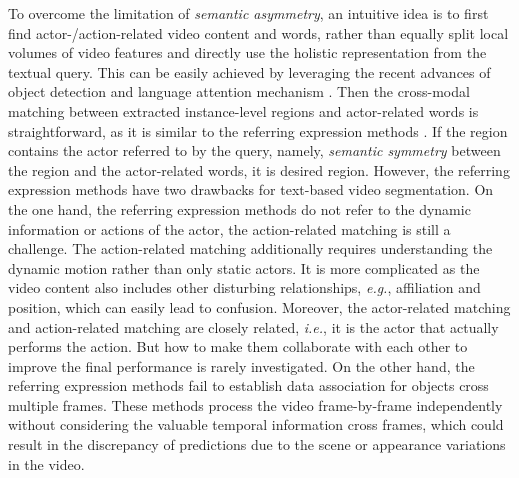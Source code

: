 \documentclass[journal]{IEEEtran}
\begin{document}
To overcome the limitation of \emph{semantic asymmetry}, an intuitive idea is to first find actor-/action-related video content and words, rather than equally split local volumes of video features and directly use the holistic representation from the textual query. This can be easily achieved by leveraging the recent advances of object detection \cite{liu2016ssd,ren2015faster,he2017mask} and language attention mechanism \cite{hu2017modeling,yu2018mattnet,wang2019neighbourhood}. Then the cross-modal matching between extracted instance-level regions and actor-related words is straightforward, as it is similar to the referring expression methods \cite{yu2018mattnet,wang2019neighbourhood}. If the region contains the actor referred to by the query, namely, \emph{semantic symmetry} between the region and the actor-related words, it is desired region. However, the referring expression methods have two drawbacks for text-based video segmentation. On the one hand, the referring expression methods do not refer to the dynamic information or actions of the actor, the action-related matching is still a challenge. The action-related matching additionally requires understanding the dynamic motion rather than only static actors. It is more complicated as the video content also includes other disturbing relationships, \emph{e.g.}, affiliation and position, which can easily lead to confusion. Moreover, the actor-related matching and action-related matching are closely related, \emph{i.e.}, it is the actor that actually performs the action. But how to make them collaborate with each other to improve the final performance is rarely investigated. On the other hand, the referring expression methods fail to establish data association for objects cross multiple frames. These methods process the video frame-by-frame independently without considering the valuable temporal information cross frames, which could result in the discrepancy of predictions due to the scene or appearance variations in the video.
\end{document}
